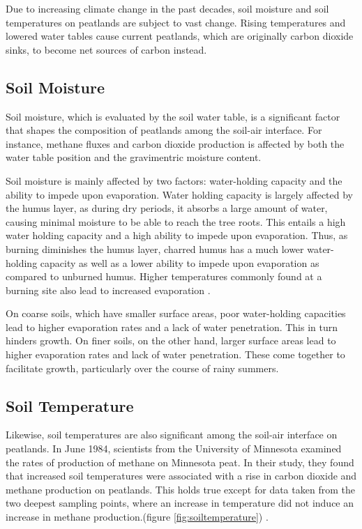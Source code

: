Due to increasing climate change in the past decades, soil moisture and soil temperatures on peatlands are subject to vast change. Rising temperatures and lowered water tables cause current peatlands, which are originally carbon dioxide sinks, to become net sources of carbon instead.

\subsection{Soil Moisture}

Soil moisture, which is evaluated by the soil water table, is a significant factor that shapes the composition of peatlands among the soil-air interface. For instance, methane fluxes and carbon dioxide production is affected by both the water table position and the gravimentric moisture content.

Soil moisture is mainly affected by two factors: water-holding capacity and the ability to impede upon evaporation. Water holding capacity is largely affected by the humus layer, as during dry periods, it absorbs a large amount of water, causing minimal moisture to be able to reach the tree roots. This entails a high water holding capacity and a high ability to impede upon evaporation. Thus, as burning diminishes the humus layer, charred humus has a much lower water-holding capacity as well as a lower ability to impede upon evaporation as compared to unburned humus. Higher temperatures commonly found at a burning site also lead to increased evaporation \citep{kozlowski2012fire}.

On coarse soils, which have smaller surface areas, poor water-holding capacities lead to higher evaporation rates and a lack of water penetration. This in turn hinders growth. On finer soils, on the other hand, larger surface areas lead to higher evaporation rates and lack of water penetration. These come together to facilitate growth, particularly over the course of rainy summers.

\subsection{Soil Temperature}

Likewise, soil temperatures are also significant among the soil-air interface on peatlands. In June 1984, scientists from the University of Minnesota examined the rates of production of methane on Minnesota peat. In their study, they found that increased soil temperatures were associated with a rise in carbon dioxide and methane production on peatlands. This holds true except for data taken from the two deepest sampling points, where an increase in temperature did not induce an increase in methane production.(figure \ref{fig:soiltemperature}) \citep{williams1984methane}.

